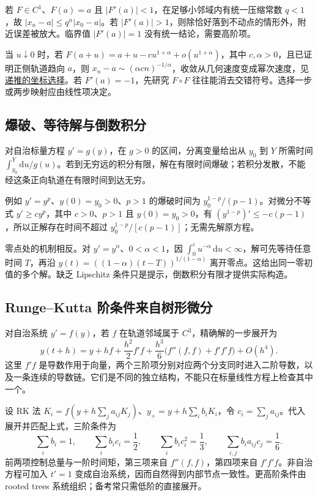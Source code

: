 \documentclass[12pt,fontset=fandol]{ctexart}
\begin{document}
若 $F\in C^1$、$F(a)=a$ 且 $|F'(a)|<1$，在足够小邻域内有统一压缩常数 $q<1$，故 $|x_n-a|\leq q^n|x_0-a|$。若 $|F'(a)|>1$，则除恰好落到不动点的情形外，附近误差被放大。临界值 $|F'(a)|=1$ 没有统一结论，需要高阶项。

当 $u\downarrow0$ 时，若 $F(a+u)=a+u-cu^{1+\alpha}+o(u^{1+\alpha})$，其中 $c,\alpha>0$，且已证明正侧轨道趋向 $a$，则 $x_n-a\sim(\alpha cn)^{-1/\alpha}$，收敛从几何速度变成幂次速度，见\hyperref[app:estimate-recursion]{递推的坐标选择}。若 $F'(a)=-1$，先研究 $F\circ F$ 往往能消去交错符号。选择一步或两步映射应由线性项决定。

\subsection{爆破、等待解与倒数积分}

\label{app:dynamics-blowup}

对自治标量方程 $y'=g(y)$，在 $g>0$ 的区间，分离变量给出从 $y_0$ 到 $Y$ 所需时间 $\int_{y_0}^Y\mathrm du/g(u)$。若到无穷远的积分有限，解在有限时间爆破；若积分发散，不能经这条正向轨道在有限时间到达无穷。

例如 $y'=y^p$、$y(0)=y_0>0$、$p>1$ 的爆破时间为 $y_0^{1-p}/(p-1)$。对微分不等式 $y'\geq cy^p$，其中 $c>0$、$p>1$ 且 $y(0)=y_0>0$，有 $(y^{1-p})'\leq-c(p-1)$，所以正解存在时间不超过 $y_0^{1-p}/[c(p-1)]$；无需先解原方程。

零点处的机制相反。对 $y'=y^\alpha$、$0<\alpha<1$，因 $\int_0^\varepsilon u^{-\alpha}\,\mathrm du<\infty$，解可先等待任意时间 $T$，再沿 $y(t)=((1-\alpha)(t-T))^{1/(1-\alpha)}$ 离开零点。这给出同一零初值的多个解。缺乏 Lipschitz 条件只是提示，倒数积分有限才提供实际构造。

\subsection{Runge–Kutta 阶条件来自树形微分}

\label{app:dynamics-rk}

对自治系统 $y'=f(y)$，若 $f$ 在轨道邻域属于 $C^3$，精确解的一步展开为
\[
y(t+h)=y+hf+\frac{h^2}{2}f'f
+\frac{h^3}{6}\bigl(f''(f,f)+f'f'f\bigr)+O(h^4).
\]
这里 $f'f$ 是导数作用于向量，两个三阶项分别对应两个分支同时进入二阶导数，以及一条连续的导数链。它们是不同的独立结构，不能只在标量线性方程上检查其中一个。

设 RK 法 $K_i=f(y+h\sum_ja_{ij}K_j)$、$y_+=y+h\sum_ib_iK_i$，令 $c_i=\sum_ja_{ij}$。代入展开并匹配上式，三阶条件为
\[
\sum_ib_i=1,\qquad\sum_ib_ic_i=\frac12,
\qquad\sum_ib_ic_i^2=\frac13,
\qquad\sum_{i,j}b_ia_{ij}c_j=\frac16.
\]
前两项控制总量与一阶时间矩，第三项来自 $f''(f,f)$，第四项来自 $f'f'f$。非自治方程可加入 $t'=1$ 变成自治系统，因而自然得到内部节点一致性。更高阶条件由 rooted trees 系统组织；备考常只需低阶的直接展开。
\end{document}

